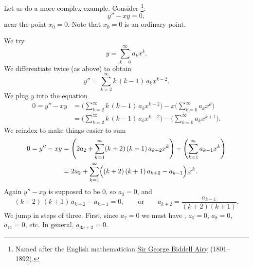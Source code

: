 \begin{example}
Let us do a more complex example.  Consider
\emph{}%
\footnote{Named after the English mathematician
\href{http://en.wikipedia.org/wiki/George_Biddell_Airy}{Sir George Biddell Airy}
(1801--1892).}:
\begin{equation*}
y'' - xy = 0 ,
\end{equation*}
near the point $x_0 = 0$.  Note that $x_0 = 0$ is an ordinary point.

\pagebreak[2]
We try
\begin{equation*}
y = \sum_{k=0}^\infty a_k x^k .
\end{equation*}
We differentiate twice (as above) to obtain
\begin{equation*}
y'' = \sum_{k=2}^\infty k\,(k-1) \, a_k x^{k-2} .
\end{equation*}
We plug $y$ into the equation
\begin{equation*}
\begin{split}
0 = y''-xy &= 
\Biggl( \sum_{k=2}^\infty k\,(k-1) \, a_k x^{k-2}  \Biggr)
-
x
\Biggl( \sum_{k=0}^\infty a_k x^k \Biggr)
\\
&=
\Biggl( \sum_{k=2}^\infty k\,(k-1) \, a_k x^{k-2}  \Biggr)
-
\Biggl( \sum_{k=0}^\infty a_k x^{k+1} \Biggr) .
\end{split}
\end{equation*}
We reindex to make things easier to sum
\begin{equation*}
\begin{split}
0 = y''-xy
&= 
\Biggl( 2 a_2 + \sum_{k=1}^\infty (k+2)\,(k+1) \, a_{k+2} x^k  \Biggr)
-
\Biggl( \sum_{k=1}^\infty a_{k-1} x^k \Biggr)
\\
&= 
2 a_2 + 
\sum_{k=1}^\infty \Bigl( (k+2)\,(k+1) \, a_{k+2} - a_{k-1} \Bigr) \, x^k .
\end{split}
\end{equation*}
Again $y''-xy$ is supposed to be 0, so $a_2 = 0$, and
\begin{equation*}
(k+2)\,(k+1) \,a_{k+2} - a_{k-1} = 0 ,
\qquad
\text{or}
\qquad
a_{k+2} = \frac{a_{k-1}}{(k+2)(k+1)} .
\end{equation*}
We jump in steps of three.  First, since $a_2 = 0$
we must have , $a_5 = 0$, $a_8 = 0$, $a_{11}=0$, etc.
In general, $a_{3n+2} = 0$.


\end{example}

